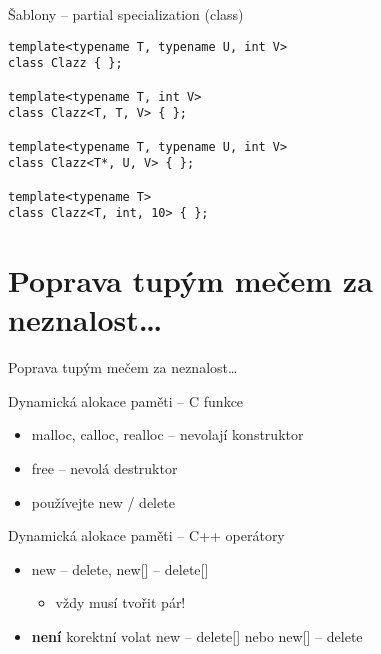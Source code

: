 \begin{frame}[fragile]
\begin{exampleblock}{Šablony -- partial specialization (class)} 
\begin{lstlisting}
template<typename T, typename U, int V>
class Clazz { };

template<typename T, int V>
class Clazz<T, T, V> { };

template<typename T, typename U, int V>
class Clazz<T*, U, V> { };

template<typename T>
class Clazz<T, int, 10> { };

\end{lstlisting}
\end{exampleblock}
\end{frame}


\section{Poprava tupým mečem za neznalost\ldots}


\begin{frame}
	\begin{block}{} 
		\begin{center}
			\Huge
			Poprava tupým mečem za neznalost\ldots
		\end{center}
	\end{block}
\end{frame}

\begin{frame}[fragile]
\begin{alertblock}{Dynamická alokace paměti -- C funkce} 
\begin{itemize}
	\item malloc, calloc, realloc -- nevolají konstruktor
	\item free -- nevolá destruktor
	\item používejte new / delete
\end{itemize}
\end{alertblock}

\begin{exampleblock}{Dynamická alokace paměti -- C++ operátory} 
	\begin{itemize}
		\item new -- delete, new[] -- delete[]
\begin{itemize}		\item vždy musí tvořit pár!\end{itemize}
		\item \textbf{není} korektní volat new -- delete[] nebo new[] -- delete
	\end{itemize}
\end{exampleblock}
\end{frame}


